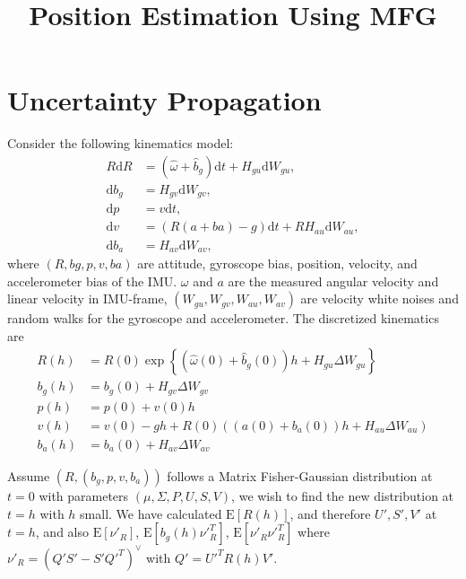 \documentclass[10pt]{article}
\title{\vspace{-4ex}\textbf{Position Estimation Using MFG\vspace{-4ex}}}
\date{}
\newcommand{\expect}[1]{\ensuremath{\mathrm{E}\left[ #1 \right]}}
\newcommand{\diff}[1]{\ensuremath{\mathrm{d} #1}}
\begin{document}
\maketitle

\section{Uncertainty Propagation}

Consider the following kinematics model:
\begin{align}
	R\diff{R} &= (\hat{\omega}+\hat{b}_g)\diff{t} + H_{gu}\diff{W_{gu}}, \\
	\diff{b_g} &= H_{gv}\diff{W_{gv}}, \\
	\diff{p} &= v\diff{t}, \\
	\diff{v} &= (R(a+ba)-g)\diff{t} + RH_{au}\diff{W_{au}}, \\
	\diff{b_a} &= H_{av}\diff{W_{av}},
\end{align}
where $(R,bg,p,v,ba)$ are attitude, gyroscope bias, position, velocity, and accelerometer bias of the IMU.
$\omega$ and $a$ are the measured angular velocity and linear velocity in IMU-frame, $(W_{gu},W_{gv},W_{au},W_{av})$ are velocity white noises and random walks for the gyroscope and accelerometer.
The discretized kinematics are
\begin{align}
	R(h) &= R(0)\exp\left\{ (\hat{\omega}(0) + \hat{b}_g(0))h + H_{gu}\Delta W_{gu} \right\} \\
	b_g(h) &= b_g(0) + H_{gv}\Delta W_{gv} \\
	p(h) &= p(0) + v(0)h \\
	v(h) &= v(0)-gh + R(0)\left( (a(0)+b_a(0))h + H_{au}\Delta W_{au} \right)\\
	b_a(h) &= b_a(0) + H_{av}\Delta W_{av}
\end{align}

Assume $(R,(b_g,p,v,b_a))$ follows a Matrix Fisher-Gaussian distribution at $t=0$ with parameters $(\mu,\Sigma,P,U,S,V)$, we wish to find the new distribution at $t=h$ with $h$ small.
We have calculated $\expect{R(h)}$, and therefore $U',S',V'$ at $t=h$, and also $\expect{\nu'_R}$, $\expect{b_g(h)\nu'^T_R}$, $\expect{\nu'_R\nu'^T_R}$ where $\nu'_R = (Q'S'-S'Q'^T)^\vee$ with $Q' = U'^TR(h)V'$.
\end{document}
